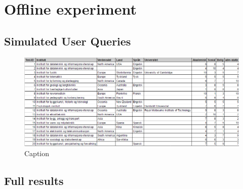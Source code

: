 \chapter{Offline experiment}

\section{Simulated User Queries}
\label{app:user_queries}

\begin{figure}[h]
    \centering
    \includegraphics[width=1.0\textwidth]{fig/simulated_queries.PNG}
    \caption[]{Caption}
    \label{fig:my_label}
\end{figure}


\section{Full results}

